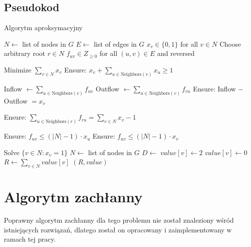\subsection{Pseudokod}
\begin{algorithm}[H]
    \caption*{Algorytm aproksymacyjny}
    \begin{algorithmic}[1]
        \State $N \gets$ list of nodes in $G$
        \State $E \gets$ list of edges in $G$
        \State $x_v \in \{0,1\}$ for all $v \in N$
        \State Choose arbitrary root $r \in N$
        \State $f_{uv} \in {Z}_{\geq 0}$ for all $(u,v) \in E$ and reversed
    
        \State Minimize $\sum_{v \in N} x_v$
            \State Ensure: $x_v + \sum_{u \in \text{Neighbors}(v)} x_u \geq 1$ 
        \EndFor
    
            \State Inflow $\gets \sum_{u \in \text{Neighbors}(v)} f_{uv}$
            \State Outflow $\gets \sum_{u \in \text{Neighbors}(v)} f_{vu}$
            \State Ensure: Inflow $-$ Outflow $= x_v$ 
        \EndFor
    
        \State Ensure: $\sum_{u \in \text{Neighbors}(r)} f_{ru} = \sum_{v \in N} x_v - 1$ 
    
            \State Ensure: $f_{uv} \leq (|N|-1) \cdot x_u$
            \State Ensure: $f_{uv} \leq (|N|-1) \cdot x_v$ 
        \EndFor
    
        \State Solve
        \State \Return $\{v \in N : x_v = 1\}$
    \EndFunction
        \State $N \gets$ list of nodes in $G$
        \State $D \gets$ 
                \State $value[v] \gets 2$
            \Else
                \State $value[v] \gets 0$
            \EndIf
        \EndFor
        \State $R \gets \sum_{v \in N} value[v]$
        \State \Return $(R, value)$
    \EndFunction
    \end{algorithmic}
    \end{algorithm}

    \section{Algorytm zachłanny}

    Poprawny algorytm zachłanny dla tego problemu nie został znaleziony wśród istniejących rozwiązań, dlatego został on opracowany i zaimplementowany w ramach tej pracy. 

